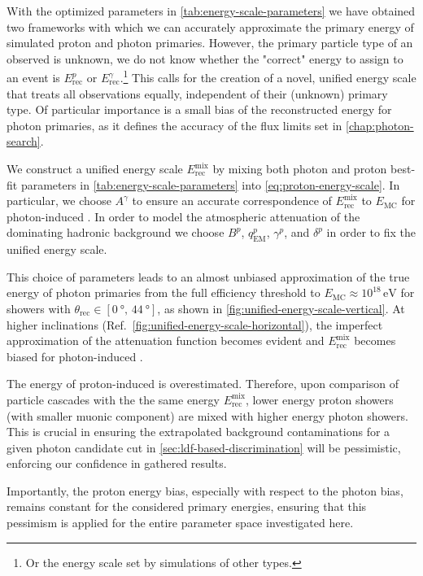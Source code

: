 With the optimized parameters in \cref{tab:energy-scale-parameters} we have 
obtained two frameworks with which we can accurately approximate the primary
energy of simulated proton and photon primaries. However, the primary particle 
type of an observed \EAS is unknown, we do not know whether the "correct" energy
to assign to an event is $E^p_\mathrm{rec}$ or 
$E^\gamma_\mathrm{rec}$.\footnote{Or the energy scale set by simulations of 
other \CR types.} This calls for the creation of a novel, unified energy scale
that treats all \CR observations equally, independent of their (unknown) primary
type. Of particular importance is a small bias of the reconstructed energy for
photon primaries, as it defines the accuracy of the flux limits set in 
\cref{chap:photon-search}.

We construct a unified energy scale $E^\mathrm{mix}_\mathrm{rec}$ by mixing both
photon and proton best-fit parameters in \cref{tab:energy-scale-parameters} into
\cref{eq:proton-energy-scale}. In particular, we choose $A^\gamma$ to ensure an
accurate correspondence of $E^\mathrm{mix}_\mathrm{rec}$ to $E_\mathrm{MC}$ for
photon-induced \EASs. In order to model the atmospheric attenuation of the 
dominating hadronic background we choose $B^p$, $q^p_\mathrm{EM}$, $\gamma^p$, 
and $\delta^p$ in order to fix the unified energy scale.

This choice of parameters leads to an almost unbiased approximation of the true
energy of photon primaries from the full efficiency threshold to 
$E_\mathrm{MC} \approx 10^{18}\,\mathrm{eV}$ for showers with 
$\theta_\mathrm{rec}\in[\SI{0}{\degree},\,\SI{44}{\degree}]$, as shown in
\cref{fig:unified-energy-scale-vertical}. At higher inclinations 
(Ref.~\cref{fig:unified-energy-scale-horizontal}), the imperfect approximation 
of the attenuation function becomes evident and $E^\mathrm{mix}_\mathrm{rec}$ 
becomes biased for photon-induced \EASs.

The energy of proton-induced \EASs is overestimated. Therefore, upon comparison 
of particle cascades with the the same energy $E^\mathrm{mix}_\mathrm{rec}$, 
lower energy proton showers (with smaller muonic component) are mixed with 
higher energy photon showers. This is crucial in ensuring the extrapolated 
background contaminations for a given photon candidate cut in 
\cref{sec:ldf-based-discrimination} will be pessimistic, enforcing our 
confidence in gathered results.

Importantly, the proton energy bias, especially with respect to the photon bias,
remains constant for the considered primary energies, ensuring that this 
pessimism is applied for the entire parameter space investigated here.

